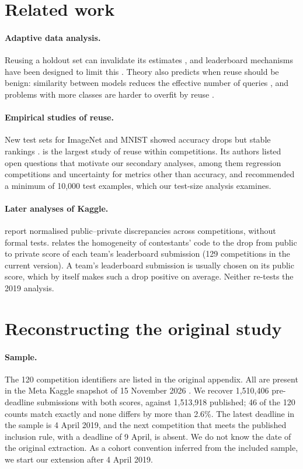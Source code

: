 \documentclass[10pt]{article}
\begin{document}
\section{Related work}

\paragraph{Adaptive data analysis.} Reusing a holdout set can invalidate its estimates \citep{dwork2015reusable}, and leaderboard mechanisms have been designed to limit this \citep{blum2015ladder}. Theory also predicts when reuse should be benign: similarity between models reduces the effective number of queries \citep{mania2019similarity}, and problems with more classes are harder to overfit by reuse \citep{feldman2019multiclass}.

\paragraph{Empirical studies of reuse.} New test sets for ImageNet and MNIST showed accuracy drops but stable rankings \citep{recht2019imagenet,yadav2019cold}. \citet{roelofs2019meta} is the largest study of reuse within competitions. Its authors listed open questions that motivate our secondary analyses, among them regression competitions and uncertainty for metrics other than accuracy, and recommended a minimum of 10,000 test examples, which our test-size analysis examines.

\paragraph{Later analyses of Kaggle.} \citet{bonisch2025chronicles} report normalised public--private discrepancies across competitions, without formal tests. \citet{burtch2026monoculture} relates the homogeneity of contestants' code to the drop from public to private score of each team's leaderboard submission (129 competitions in the current version). A team's leaderboard submission is usually chosen on its public score, which by itself makes such a drop positive on average. Neither re-tests the 2019 analysis.

\section{Reconstructing the original study}
\label{sec:recon}

\paragraph{Sample.} The 120 competition identifiers are listed in the original appendix. All are present in the Meta Kaggle snapshot of 15 November 2026 \citep{metakaggle}. We recover 1,510,406 pre-deadline submissions with both scores, against 1,513,918 published; 46 of the 120 counts match exactly and none differs by more than 2.6\%. The latest deadline in the sample is 4 April 2019, and the next competition that meets the published inclusion rule, with a deadline of 9 April, is absent. We do not know the date of the original extraction. As a cohort convention inferred from the included sample, we start our extension after 4 April 2019.
\end{document}
